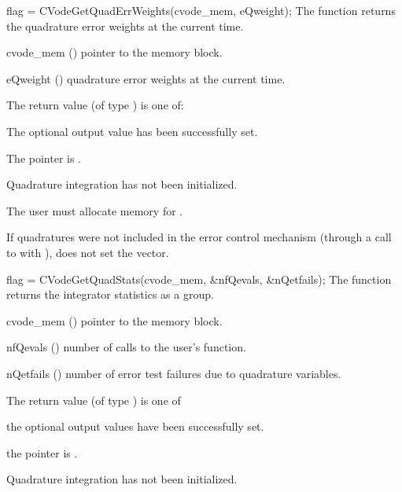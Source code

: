 {}
{
  flag = CVodeGetQuadErrWeights(cvode\_mem, eQweight);
}
{
  The function  returns the quadrature error weights 
  at the current time.
}
{
  \begin{args}
  \item[cvode\_mem] ()
    pointer to the {\cvodes} memory block.
  \item[eQweight] ()
    quadrature error weights at the current time.
  \end{args}
}
{
  The return value  (of type ) is one of:
  \begin{args}
  \item[\Id{CV\_SUCCESS}] 
    The optional output value has been successfully set.
  \item[\Id{CV\_MEM\_NULL}]
    The  pointer is .
  \item[\Id{CV\_NO\_QUAD}]
    Quadrature integration has not been initialized.
  \end{args}
}
{
  {\warn}The user must allocate memory for .

  If quadratures were not included in the error control mechanism (through a 
  call to  with ), 
   does not set the  vector.
}
{
  flag = CVodeGetQuadStats(cvode\_mem, \&nfQevals, \&nQetfails);
}
{
  The function  returns the {\cvodes} integrator statistics
  as a group.
}
{
  \begin{args}
  \item[cvode\_mem] ()
    pointer to the {\cvodes} memory block.
  \item[nfQevals] ()
    number of calls to the user's  function.
  \item[nQetfails] ()
    number of error test failures due to quadrature variables.
  \end{args}
}
{
  The return value  (of type ) is one of
  \begin{args}
  \item[\Id{CV\_SUCCESS}] 
    the optional output values have been successfully set.
  \item[\Id{CV\_MEM\_NULL}]
    the  pointer is .
  \item[\Id{CV\_NO\_QUAD}]
    Quadrature integration has not been initialized.
  \end{args}
}
{}

